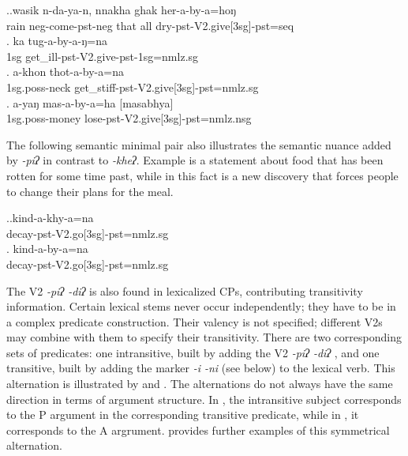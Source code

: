 \ex.\ag.wasik n-da-ya-n, nnakha ghak her-a-by-a=hoŋ\\
rain {\sc neg-}come{\sc [3sg]-pst-neg} that all dry{\sc -pst-V2.give[3sg]-pst=seq}\\
\bg. ka tug-a-by-a-ŋ=na\\
{\sc 1sg} get\_ill{\sc -pst-V2.give-pst-1sg=nmlz.sg}\\
\bg. a-khon thot-a-by-a=na\\
{\sc 1sg.poss-}neck get\_stiff{\sc -pst-V2.give[3sg]-pst=nmlz.sg}\\
\bg. a-yaŋ mas-a-by-a=ha [masabhya]\\
{\sc 1sg.poss-}money lose{\sc -pst-V2.give[3sg]-pst=nmlz.nsg}\\


The following semantic minimal pair also illustrates the semantic nuance added by  \emph{-piʔ} in contrast to \emph{-kheʔ}. Example \Next[a] is a  statement about  food that has been rotten for some time past, while in \Next[b] this fact is a new discovery that forces people to change their plans for the meal.

\ex.\ag.kind-a-khy-a=na\\
decay{\sc -pst-V2.go[3sg]-pst=nmlz.sg}\\
\bg. kind-a-by-a=na\\
decay{\sc -pst-V2.go[3sg]-pst=nmlz.sg} \\


The V2 \emph{-piʔ  \ti -diʔ} is also found in lexicalized CPs, contributing transitivity information. Certain lexical stems never occur independently; they have to be in a complex predicate construction. Their valency is not specified; different  V2s may combine with them to specify their transitivity. There are two  corresponding sets of predicates: one intransitive, built by adding the V2 \emph{-piʔ  \ti -diʔ} , and one transitive, built by adding the marker \emph{-i \ti -ni}  (see  below) to the lexical verb. This alternation is illustrated by \Next and \NNext. The alternations do not always have  the same direction in terms of argument structure. In \Next, the intransitive subject corresponds to the P argument in the corresponding transitive predicate, while in \NNext, it corresponds to the A argrument.  provides further examples of this symmetrical alternation.


